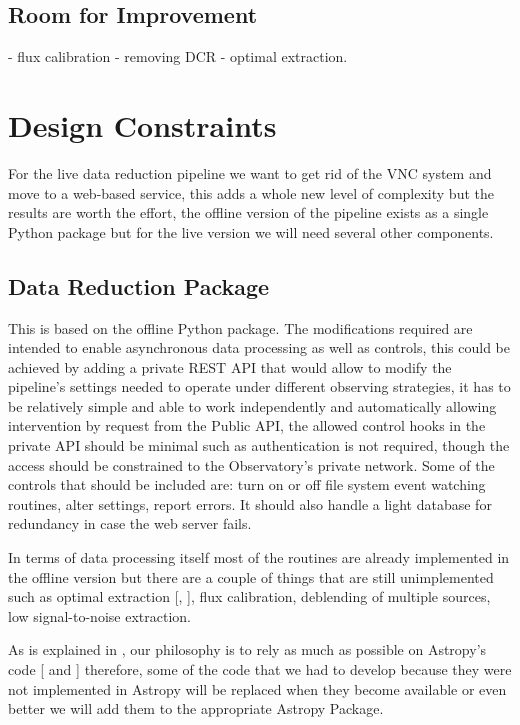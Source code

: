 \documentclass[11pt,twoside]{article}
\begin{document}
\subsection{Room for Improvement}
- flux calibration
- removing DCR
- optimal extraction.

\section{Design Constraints}

For the live data reduction pipeline we want to get rid of the VNC system and move to a web-based service, this adds a whole new level of complexity but the results are worth the effort, the offline version of the pipeline exists as a single Python package but for the live version  we will need several other components.

\subsection{Data Reduction Package}

This is based on the offline Python package. The modifications required are intended to enable asynchronous data processing as well as controls, this could be achieved by adding a private REST API that would allow to modify the pipeline's settings needed to operate under different observing strategies, it has to be relatively simple and able to work independently and automatically allowing intervention by request from the Public API, the allowed control hooks in the private API should be minimal such as authentication is not required, though the access should be constrained to the Observatory's private network. Some of the controls that should be included are: turn on or off file system event watching routines, alter settings, report errors. It should also handle a light database for redundancy in case the web server fails.

In terms of data processing itself most of the routines are already implemented in the offline version but there are a couple of things that are still unimplemented such as optimal extraction [\citet{1989PASP..101.1032M},  \citet{1986PASP...98..609H}], flux calibration, deblending of multiple sources, low signal-to-noise extraction.

As is explained in \citet{P9-115_adassxxvii}, our philosophy is to rely as much as possible on Astropy's code   [\citet{2013A&A...558A..33A} and \citet{2018AJ....156..123A}] therefore, some of the code that we had to develop because they were not implemented in Astropy will be replaced when they become available or even better we will add them to the appropriate Astropy Package.
\end{document}

